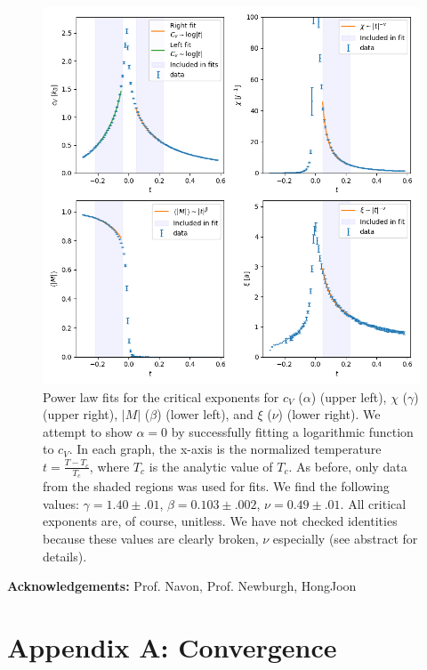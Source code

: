 \documentclass[letter,scriptaddress,twocolumn, prl]{revtex4}
\begin{document}
\begin{figure}[h]
	\begin{center}
		\includegraphics[width=1\textwidth]{figs/fig5_crit_exponents.png}
		\caption{Power law fits for the critical exponents for $c_V$ ($\alpha$) (upper left), $\chi$ ($\gamma$) (upper right), $|M|$ ($\beta$) (lower left), and $\xi$ ($\nu$) (lower right). We attempt to show $\alpha = 0$ by successfully fitting a logarithmic function to $c_V$. In each graph, the x-axis is the normalized temperature $t = \frac{T - T_c}{T_c}$, where $T_c$ is the analytic value of $T_c$. As before, only data from the shaded regions was used for fits. We find the following values: $\gamma = 1.40 \pm .01$, $\beta = 0.103 \pm .002$, $\nu = 0.49 \pm .01$. All critical exponents are, of course, unitless. We have not checked identities because these values are clearly broken, $\nu$ especially (see abstract for details).}
		\label{fig:fig5}
	\end{center}
\end{figure}

\textbf{Acknowledgements:}
	Prof. Navon, Prof. Newburgh, HongJoon
	
 


\appendix
\section{Appendix A: Convergence}
\end{document}
